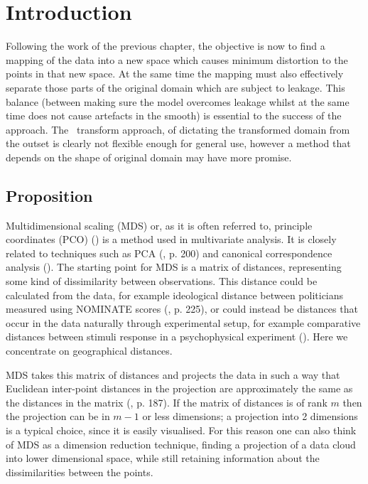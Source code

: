 
\label{chap-mds}

\section{Introduction}

Following the work of the previous chapter, the objective is now to find a mapping of the data into a new space which causes minimum distortion to the points in that new space. At the same time the mapping must also effectively separate those parts of the original domain which are subject to leakage. This balance (between making sure the model overcomes leakage whilst at the same time does not cause artefacts in the smooth) is essential to the success of the approach. The \sch\ transform approach, of dictating the transformed domain from the outset is clearly not flexible enough for general use, however a method that depends on the shape of original domain may have more promise.

\subsection{Proposition}

Multidimensional scaling (MDS) or, as it is often referred to, principle coordinates (PCO) (\cite{gower1966}) is a method used in multivariate analysis. It is closely related to techniques such as PCA (\cite{chatfieldcollins}, p. 200) and canonical correspondence analysis (\cite{terbraak}). The starting point for MDS is a matrix of distances, representing some kind of dissimilarity between observations. This distance could be calculated from the data, for example ideological distance between politicians measured using NOMINATE scores (\cite{quantss}, p. 225), or could instead be distances that occur in the data naturally through experimental setup,  for example comparative distances between stimuli response in a psychophysical experiment (\cite{torgerson}). Here we concentrate on geographical distances.

MDS takes this matrix of distances and projects the data in such a way that Euclidean inter-point distances in the projection are approximately the same as the distances in the matrix (\cite{chatfieldcollins}, p. 187). If the matrix of distances is of rank $m$ then the projection can be in $m-1$ or less dimensions; a projection into 2 dimensions is a typical choice, since it is easily visualised. For this reason one can also think of MDS as a dimension reduction technique, finding a projection of a data cloud into lower dimensional space, while still retaining information about the dissimilarities between the points.


